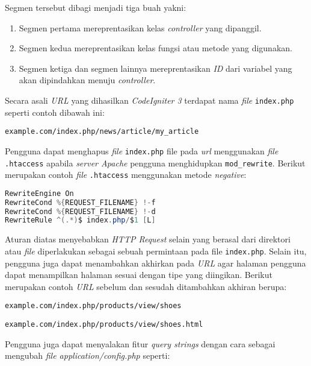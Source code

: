 Segmen tersebut dibagi menjadi tiga buah yakni:
\begin{enumerate}
\item Segmen pertama mereprentasikan kelas \textit{controller} yang dipanggil.
\item Segmen kedua mereprentasikan kelas fungsi atau metode yang digunakan.
\item Segmen ketiga dan segmen lainnya mereprentasikan \textit{ID} dari variabel yang akan dipindahkan menuju \textit{controller}.
\end{enumerate}

Secara asali \textit{URL} yang dihasilkan \textit{CodeIgniter 3} terdapat nama \textit{file} \verb|index.php| seperti contoh dibawah ini:

\begin{center}
\verb|example.com/index.php/news/article/my_article|
\end{center}

Pengguna dapat menghapus \textit{file} \verb|index.php| file pada \textit{url} menggunakan \textit{file} \verb|.htaccess| apabila \textit{server Apache} pengguna menghidupkan \verb|mod_rewrite|. Berikut merupakan contoh \textit{file} \verb|.htaccess| menggunakan metode \textit{negative}:

\begin{lstlisting}[language=Java, caption=Contoh \textit{file} \texttt{.htaccess} pada halaman index.php, label=kode:htaccess]
RewriteEngine On
RewriteCond %{REQUEST_FILENAME} !-f
RewriteCond %{REQUEST_FILENAME} !-d
RewriteRule ^(.*)$ index.php/$1 [L]
\end{lstlisting}

Aturan diatas menyebabkan \textit{HTTP Request} selain yang berasal dari direktori atau \textit{file} diperlakukan sebagai sebuah permintaan pada file \verb|index.php|. Selain itu, pengguna juga dapat menambahkan akhirkan pada \textit{URL} agar halaman pengguna dapat menampilkan halaman sesuai dengan tipe yang diingikan. Berikut merupakan contoh \textit{URL} sebelum dan sesudah ditambahkan akhiran berupa: 

\begin{center}
\verb|example.com/index.php/products/view/shoes|

\verb|example.com/index.php/products/view/shoes.html|
\end{center}

Pengguna juga dapat menyalakan fitur \textit{query strings} dengan cara sebagai mengubah \textit{file application/config.php} seperti:

